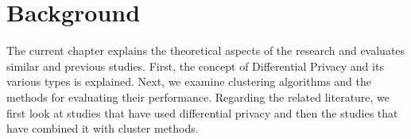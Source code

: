 \chapter{Background}
The current chapter explains the theoretical aspects of the research and evaluates similar and previous studies.
First, the concept of Differential Privacy and its various types is explained.
Next, we examine clustering algorithms and the methods for evaluating their performance.
Regarding the related literature, we first look at studies that have used differential privacy and then the studies that have combined it with cluster methods.





